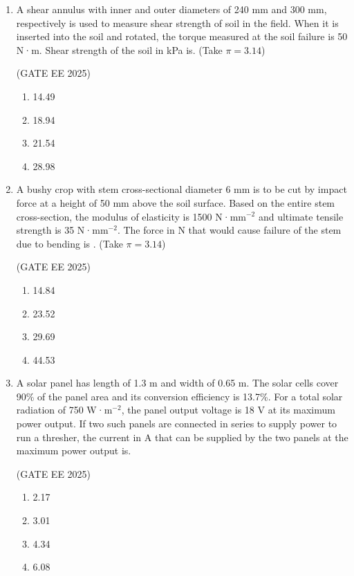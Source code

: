 \documentclass[journal,12pt,onecolumn]{IEEEtran}
\theoremstyle{remark}
\begin{document}
\begin{enumerate}
\item A shear annulus with inner and outer diameters of 240 mm and 300 mm, respectively is used to measure shear strength of soil in the field. When it is inserted into the soil and rotated, the torque measured at the soil failure is 50 N·m. Shear strength of the soil in kPa is. (Take $\pi = 3.14$)

\hfill(GATE EE 2025)

\begin{multicols}{4}
\begin{enumerate}
\item 14.49
\item 18.94
\item 21.54
\item 28.98
\end{enumerate}
\end{multicols}

\item A bushy crop with stem cross-sectional diameter 6 mm is to be cut by impact force at a height of 50 mm above the soil surface. Based on the entire stem cross-section, the modulus of elasticity is 1500 N·mm$^{-2}$ and ultimate tensile strength is 35 N·mm$^{-2}$. The force in N that would cause failure of the stem due to bending is . (Take $\pi = 3.14$)

\hfill(GATE EE 2025)

\begin{multicols}{4}
\begin{enumerate}
\item 14.84
\item 23.52
\item 29.69
\item 44.53
\end{enumerate}
\end{multicols}

\item A solar panel has length of 1.3 m and width of 0.65 m. The solar cells cover 90\% of the panel area and its conversion efficiency is 13.7\%. For a total solar radiation of 750 W·m$^{-2}$, the panel output voltage is 18 V at its maximum power output. If two such panels are connected in series to supply power to run a thresher, the current in A that can be supplied by the two panels at the maximum power output is.

\hfill(GATE EE 2025)

\begin{multicols}{4}
\begin{enumerate}
\item 2.17
\item 3.01
\item 4.34
\item 6.08
\end{enumerate}
\end{multicols}


\end{enumerate}
\end{document}
